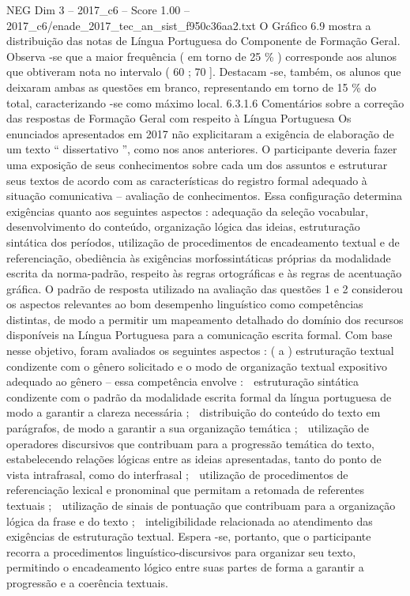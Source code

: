\begin{textsample}{NEG Dim 3 – 2017\_c6 – Score 1.00 – 2017\_c6/enade\_2017\_tec\_an\_sist\_f950c36aa2.txt}
O Gráfico 6.9 mostra a distribuição das notas de Língua Portuguesa do Componente de Formação Geral.
Observa -se que a maior frequência ( em torno de 25 \% ) corresponde aos alunos que obtiveram nota no intervalo ( 60 ; 70 ].
Destacam -se, também, os alunos que deixaram ambas as questões em branco, representando em torno de 15 \% do total, caracterizando -se como máximo local. 6.3.1.6 Comentários sobre a correção das respostas de Formação Geral com respeito à Língua Portuguesa Os enunciados apresentados em 2017 não explicitaram a exigência de elaboração de um texto “ dissertativo ”, como nos anos anteriores.
O participante deveria fazer uma exposição de seus conhecimentos sobre cada um dos assuntos e estruturar seus textos de acordo com as características do registro formal adequado à situação comunicativa – avaliação de conhecimentos.
Essa configuração determina exigências quanto aos seguintes aspectos : adequação da seleção vocabular, desenvolvimento do conteúdo, organização lógica das ideias, estruturação sintática dos períodos, utilização de procedimentos de encadeamento textual e de referenciação, obediência às exigências morfossintáticas próprias da modalidade escrita da norma-padrão, respeito às regras ortográficas e às regras de acentuação gráfica.
O padrão de resposta utilizado na avaliação das questões 1 e 2 considerou os aspectos relevantes ao bom desempenho linguístico como competências distintas, de modo a permitir um mapeamento detalhado do domínio dos recursos disponíveis na Língua Portuguesa para a comunicação escrita formal.
Com base nesse objetivo, foram avaliados os seguintes aspectos : ( a ) estruturação textual condizente com o gênero solicitado e o modo de organização textual expositivo adequado ao gênero – essa competência envolve :  estruturação sintática condizente com o padrão da modalidade escrita formal da língua portuguesa de modo a garantir a clareza necessária ;  distribuição do conteúdo do texto em parágrafos, de modo a garantir a sua organização temática ;  utilização de operadores discursivos que contribuam para a progressão temática do texto, estabelecendo relações lógicas entre as ideias apresentadas, tanto do ponto de vista intrafrasal, como do interfrasal ;  utilização de procedimentos de referenciação lexical e pronominal que permitam a retomada de referentes textuais ;  utilização de sinais de pontuação que contribuam para a organização lógica da frase e do texto ;  inteligibilidade relacionada ao atendimento das exigências de estruturação textual.
Espera -se, portanto, que o participante recorra a procedimentos linguístico-discursivos para organizar seu texto, permitindo o encadeamento lógico entre suas partes de forma a garantir a progressão e a coerência textuais.

\end{textsample}
